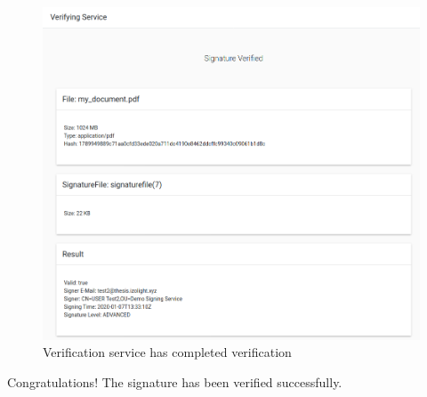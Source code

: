 \begin{figure}[H]
    \begin{center}
        \includegraphics[width=\linewidth]{images/userguide_verify_2.png}
    \end{center}
    \caption{Verification service has completed verification}
    \label{fig:verify2}
\end{figure}

Congratulations!
The signature has been verified successfully.
